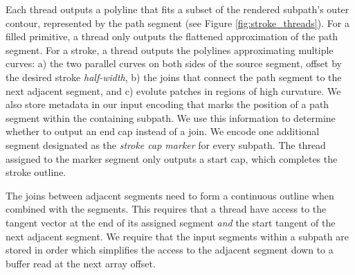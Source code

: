 \documentclass[sigconf, nonacm]{acmart}
\begin{document}
Each thread outputs a polyline that fits a subset of the rendered subpath's outer contour, represented by the path segment (see Figure \ref{fig:stroke_threads}). For a filled primitive, a thread only outputs the flattened approximation of the path segment. For a stroke, a thread outputs the polylines approximating multiple curves: a) the two parallel curves on both sides of the source segment, offset by the desired stroke \emph{half-width}, b) the joins that connect the path segment to the next adjacent segment, and c) evolute patches in regions of high curvature. We also store metadata in our input encoding that marks the position of a path segment within the containing subpath. We use this information to determine whether to output an end cap instead of a join. We encode one additional segment designated as the \emph{stroke cap marker} for every subpath. The thread assigned to the marker segment only outputs a start cap, which completes the stroke outline.

The joins between adjacent segments need to form a continuous outline when combined with the segments. This requires that a thread have access to the tangent vector at the end of its assigned segment \emph{and} the start tangent of the next adjacent segment. We require that the input segments within a subpath are stored in order which simplifies the access to the adjacent segment down to a buffer read at the next array offset.

\newcommand{\nosemic}{\SetEndCharOfAlgoLine{\relax}}%
\newcommand{\dosemic}{\SetEndCharOfAlgoLine{\string;}}%
\newcommand{\pushline}{\Indp}%
\newcommand{\popline}{\Indm\dosemic}%
\end{document}
